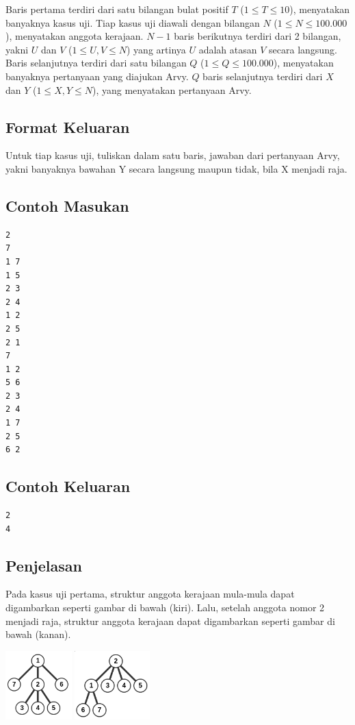 \documentclass{article}
\begin{document}
Baris pertama terdiri dari satu bilangan bulat positif $T$ ($1 \leq T \leq 10$), menyatakan banyaknya kasus uji.
Tiap kasus uji diawali dengan bilangan $N$ ($1 \leq N \leq 100.000$), menyatakan anggota kerajaan.
$N - 1$ baris berikutnya terdiri dari 2 bilangan, yakni $U$ dan $V$ ($1 \leq U, V \leq N$) yang artinya $U$ adalah atasan $V$ secara langsung.
Baris selanjutnya terdiri dari satu bilangan $Q$ ($1 \leq Q \leq 100.000$), menyatakan banyaknya pertanyaan yang diajukan Arvy.
$Q$ baris selanjutnya terdiri dari $X$ dan $Y$ ($1 \leq X, Y \leq N$), yang menyatakan pertanyaan Arvy.

\subsection*{Format Keluaran}

Untuk tiap kasus uji, tuliskan dalam satu baris, jawaban dari pertanyaan Arvy, yakni banyaknya bawahan Y secara langsung maupun tidak, bila X menjadi raja.
\\

\begin{multicols}{2}
\subsection*{Contoh Masukan}
\begin{lstlisting}
2
7
1 7
1 5
2 3
2 4
1 2
2 5
2 1
7
1 2
5 6
2 3
2 4
1 7
2 5
6 2
\end{lstlisting}
\columnbreak
\subsection*{Contoh Keluaran}
\begin{lstlisting}
2
4
\end{lstlisting}
\vfill
\null
\end{multicols}

\pagebreak

\subsection*{Penjelasan}
Pada kasus uji pertama, struktur anggota kerajaan mula-mula dapat digambarkan seperti gambar di bawah (kiri). Lalu, setelah anggota nomor 2 menjadi raja, struktur anggota kerajaan dapat digambarkan seperti gambar di bawah (kanan).

\includegraphics[height=100px]{sample-1-1}
\includegraphics[height=100px]{sample-1-2}
\end{document}
